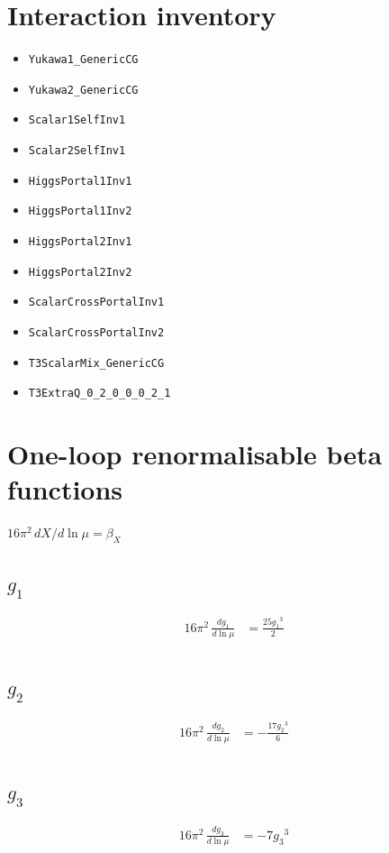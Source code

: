 \documentclass[10pt,a4paper]{article}
\begin{document}
\section*{Interaction inventory}
\begin{itemize}
\item \texttt{Yukawa1\_GenericCG}
\item \texttt{Yukawa2\_GenericCG}
\item \texttt{Scalar1SelfInv1}
\item \texttt{Scalar2SelfInv1}
\item \texttt{HiggsPortal1Inv1}
\item \texttt{HiggsPortal1Inv2}
\item \texttt{HiggsPortal2Inv1}
\item \texttt{HiggsPortal2Inv2}
\item \texttt{ScalarCrossPortalInv1}
\item \texttt{ScalarCrossPortalInv2}
\item \texttt{T3ScalarMix\_GenericCG}
\item \texttt{T3ExtraQ\_0\_2\_0\_0\_0\_2\_1}
\end{itemize}
\clearpage
\section*{One-loop renormalisable beta functions}
$16\pi^2\,dX/d\ln\mu=\beta_X$
\subsection*{$g_1$}
\begin{align*}
16\pi^2\,\frac{d g_1}{d\ln\mu} &=\frac{25 {g_1}^3}{2} \\
\end{align*}
\subsection*{$g_2$}
\begin{align*}
16\pi^2\,\frac{d g_2}{d\ln\mu} &=-\frac{17 {g_2}^3}{6} \\
\end{align*}
\subsection*{$g_3$}
\begin{align*}
16\pi^2\,\frac{d g_3}{d\ln\mu} &=-7 {g_3}^3 \\
\end{align*}
\end{document}
